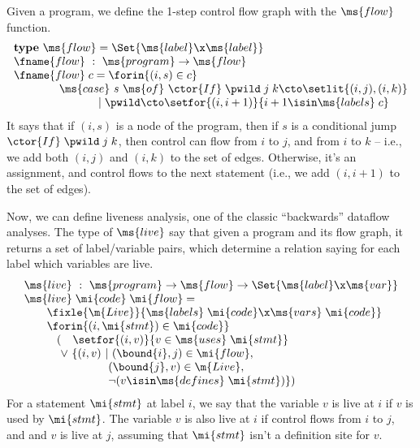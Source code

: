 Given a program, we define the 1-step control flow graph with the $\ms{flow}$
function.
\[\begin{array}{l}
\textbf{type}~\ms{flow} = \Set{\ms{label} \x \ms{label}}\\
\fname{flow} ~:~ \ms{program} \uto \ms{flow}\\
\fname{flow}\;c = \forin{(i,s) \in c}\\
\hspace{4em}\ms{case}~ s ~\ms{of}~
\ctor{If} \;\pwild \;j \;k \cto \setlit{(i,j),(i,k)}\\
\hspace{7.45em}\pipe\pwild \cto \setfor{(i,i+1)}{i+1 \isin \ms{labels}\;c}
\end{array}
\]
It says that if $(i, s)$ is a node of the program, then if $s$ is a conditional
jump $\ctor{If} \;\pwild \;j \;k$, then control can flow from $i$ to $j$, and
from $i$ to $k$ -- i.e., we add both $(i, j)$ and $(i, k)$ to the set of edges.
Otherwise, it's an assignment, and control flows to the next statement (i.e., we
add $(i, i+1)$ to the set of edges).

Now, we can define liveness analysis, one of the classic ``backwards'' dataflow
analyses. The type of $\ms{live}$ say that given a program and its flow graph,
it returns a set of label/variable pairs, which determine a relation saying
for each label which variables are live.
\[\begin{array}{l}
\ms{live} ~:~ \ms{program} \uto \ms{flow} \uto \Set{\ms{label} \x \ms{var}}\\
\ms{live} \;\mi{code} \;\mi{flow} =\\
\hspace{2em} \fixle{\m{Live}}{ %
  \ms{labels}\;\mi{code} \x \ms{vars}\;\mi{code}}\\
\hspace{2em}\forin{(i,\mi{stmt}) \in \mi{code}}\\
\hspace{2.875em} (\phantom{\vee~}\setfor{(i,v)}{v \in \ms{uses}\;\mi{stmt}}\\
\hspace{3.2em} \vee~ \{(i,v) ~|~ (\bound{i},j) \in \mi{flow},\\
\hspace{7.4em}(\bound{j},v) \in \m{Live},\\
\hspace{7.4em}\neg (v \isin \ms{defines}\; \mi{stmt})\})
\end{array}\]
For a statement $\mi{stmt}$ at label $i$, we say that the variable
$v$ is live at $i$ if $v$ is used by $\mi{stmt}$. The variable $v$
is also live at $i$ if control flows from $i$ to $j$, and and $v$
is live at $j$, assuming that $\mi{stmt}$ isn't a definition site for $v$.

